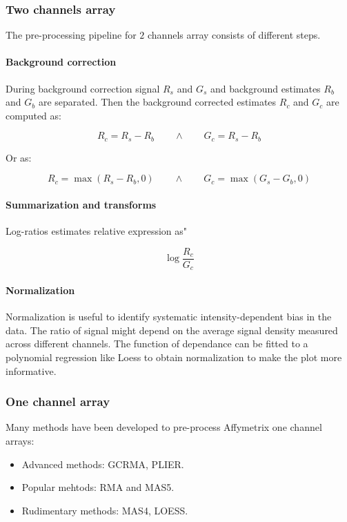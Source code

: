		\subsubsection{Two channels array}
		The pre-processing pipeline for $2$ channels array consists of different steps.

			\paragraph{Background correction}
			During background correction signal $R_s$ and $G_s$ and background estimates $R_b$ and $G_b$ are separated.
			Then the background corrected estimates $R_c$ and $G_c$ are computed as:

			$$R_c = R_s-R_b\qquad\land\qquad G_c = R_s-R_b$$

			Or as:

			$$R_c = \max(R_s-R_b, 0)\qquad\land\qquad G_c = \max(G_s-G_b, 0)$$

			\paragraph{Summarization and transforms}
			Log-ratios estimates relative expression as"

			$$\log\frac{R_c}{G_c}$$

			\paragraph{Normalization}
			Normalization is useful to identify systematic intensity-dependent bias in the data.
			The ratio of signal might depend on the average signal density measured across different channels.
			The function of dependance can be fitted to a polynomial regression like Loess to obtain normalization to make the plot more informative.

		\subsubsection{One channel array}
		Many methods have been developed to pre-process Affymetrix one channel arrays:

		\begin{multicols}{3}
			\begin{itemize}
				\item Advanced methods: GCRMA, PLIER.
				\item Popular mehtods: RMA and MAS5.
				\item Rudimentary methods: MAS4, LOESS.
			\end{itemize}
		\end{multicols}

